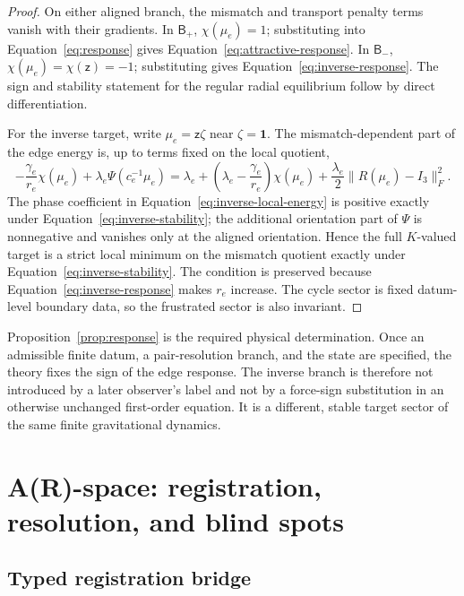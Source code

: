 \documentclass[11pt]{article}
\newcommand{\Id}{\ensuremath{\mathbf 1}}
\newcommand{\zinv}{\ensuremath{\mathsf z}}
\newcommand{\Branch}{\ensuremath{\mathsf B}}
\theoremstyle{definition}
\begin{document}
\begin{proof}
On either aligned branch, the mismatch and transport penalty terms vanish with
their gradients.  In $\Branch_+$, $\chi(\mu_e)=1$; substituting into
Equation~\eqref{eq:response} gives Equation~\eqref{eq:attractive-response}.
In $\Branch_-$, $\chi(\mu_e)=\chi(\zinv)=-1$; substituting gives
Equation~\eqref{eq:inverse-response}.  The sign and stability statement for the
regular radial equilibrium follow by direct differentiation.

For the inverse target, write $\mu_e=\zinv\zeta$ near $\zeta=\Id$.  The
mismatch-dependent part of the edge energy is, up to terms fixed on the local
quotient,
\begin{equation}
-\frac{\gamma_e}{r_e}\chi(\mu_e)
+\lambda_e\Psi(c_e^{-1}\mu_e)
=
\lambda_e+
\left(\lambda_e-\frac{\gamma_e}{r_e}\right)\chi(\mu_e)
+\frac{\lambda_e}{2}\lVert R(\mu_e)-I_3\rVert_F^2.
\label{eq:inverse-local-energy}
\end{equation}
The phase coefficient in Equation~\eqref{eq:inverse-local-energy} is positive
exactly under Equation~\eqref{eq:inverse-stability}; the additional orientation
part of $\Psi$ is nonnegative and vanishes only at the aligned orientation.
Hence the full $K$-valued target is a strict local minimum on the mismatch
quotient exactly under Equation~\eqref{eq:inverse-stability}.  The condition is
preserved because Equation~\eqref{eq:inverse-response} makes $r_e$ increase.
The cycle sector is fixed datum-level boundary data, so the frustrated sector is
also invariant.
\end{proof}

Proposition~\ref{prop:response} is the required physical determination.  Once an
admissible finite datum, a pair-resolution branch, and the state are specified,
the theory fixes the sign of the edge response.  The inverse branch is therefore
not introduced by a later observer's label and not by a force-sign substitution in
an otherwise unchanged first-order equation.  It is a different, stable target
sector of the same finite gravitational dynamics.

\section{A(R)-space: registration, resolution, and blind spots}
\label{sec:registration}

\subsection{Typed registration bridge}
\end{document}
